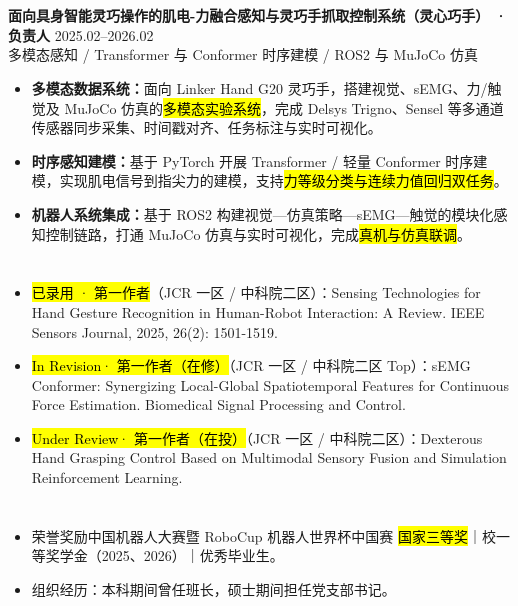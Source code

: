 \vspace{0.04em}
\section[科研与项目经历]{}
{\small\textbf{面向具身智能灵巧操作的肌电-力融合感知与灵巧手抓取控制系统（灵心巧手） · 负责人}} \hfill {2025.02--2026.02} \\
{\scriptsize\color{WHU_Blue} 多模态感知 / Transformer 与 Conformer 时序建模 / ROS2 与 MuJoCo 仿真}
\begin{itemize}
    \item \textbf{多模态数据系统：}面向 Linker Hand G20 灵巧手，搭建视觉、sEMG、力/触觉及 MuJoCo 仿真的\hl{多模态实验系统}，完成 Delsys Trigno、Sensel 等多通道传感器同步采集、时间戳对齐、任务标注与实时可视化。
    \item \textbf{时序感知建模：}基于 PyTorch 开展 Transformer / 轻量 Conformer 时序建模，实现肌电信号到指尖力的建模，支持\hl{力等级分类与连续力值回归双任务}。
    \item \textbf{机器人系统集成：}基于 ROS2 构建视觉—仿真策略—sEMG—触觉的模块化感知控制链路，打通 MuJoCo 仿真与实时可视化，完成\hl{真机与仿真联调}。
\end{itemize}

\section[论文与研究成果]{}
\begin{itemize}
    \item \hl{已录用 · 第一作者}（JCR 一区 / 中科院二区）：Sensing Technologies for Hand Gesture Recognition in Human-Robot Interaction: A Review. IEEE Sensors Journal, 2025, 26(2): 1501-1519. 
    \item \hl{In Revision· 第一作者（在修）}（JCR 一区 / 中科院二区 Top）：sEMG Conformer: Synergizing Local-Global Spatiotemporal Features for Continuous Force Estimation. Biomedical Signal Processing and Control. 
    \item \hl{Under Review· 第一作者（在投）}（JCR 一区 / 中科院二区）：Dexterous Hand Grasping Control Based on Multimodal Sensory Fusion and Simulation Reinforcement Learning. 
\end{itemize}



\section[荣誉与组织经历]{}
\begin{itemize}
    \item 荣誉奖励中国机器人大赛暨 RoboCup 机器人世界杯中国赛 \hl{国家三等奖}｜校一等奖学金（2025、2026）｜优秀毕业生。
    \item 组织经历：本科期间曾任班长，硕士期间担任党支部书记。
\end{itemize}


